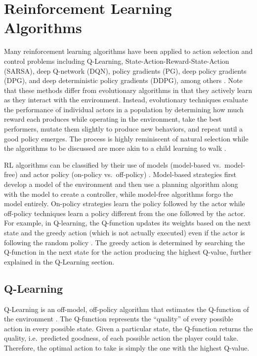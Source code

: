\section{Reinforcement Learning Algorithms}
Many reinforcement learning algorithms have been applied to action selection and control problems including Q-Learning, State-Action-Reward-State-Action (SARSA), deep Q-network (DQN), policy gradients (PG), deep policy gradients (DPG), and deep deterministic policy gradients (DDPG), among others \cite{sutton_2017}\cite{sutton_policygrad}\cite{silver_2017}\cite{silver_lever_heess_degris_wierstra_riedmiller}\cite{lillicrap_2016}. Note that these methods differ from evolutionary algorithms in that they actively learn as they interact with the environment. Instead, evolutionary techniques evaluate the performance of individual actors in a population by determining how much reward each produces while operating in the environment, take the best performers, mutate them slightly to produce new behaviors, and repeat until a good policy emerges. The process is highly reminiscent of natural selection while the algorithms to be discussed are more akin to a child learning to walk \cite{natural_selection}.

RL algorithms can be classified by their use of models (model-based vs.\ model-free) and actor policy (on-policy vs.\ off-policy) \cite{sutton_2017}. Model-based strategies first develop a model of the environment and then use a planning algorithm along with the model to create a controller, while model-free algorithms forgo the model entirely. On-policy strategies learn the policy followed by the actor while off-policy techniques learn a policy different from the one followed by the actor. For example, in Q-learning, the Q-function updates its weights based on the next state and the greedy action (which is not actually executed) even if the actor is following the random policy \cite{sutton_2017}. The greedy action is determined by searching the Q-function in the next state for the action producing the highest Q-value, further explained in the Q-Learning section.

\subsection{Q-Learning}
Q-Learning is an off-model, off-policy algorithm that estimates the Q-function of the environment \cite{sutton_2017}. The Q-function represents the ``quality'' of every possible action in every possible state. Given a particular state, the Q-function returns the quality, i.e.\ predicted goodness, of each possible action the player could take. Therefore, the optimal action to take is simply the one with the highest Q-value. 


